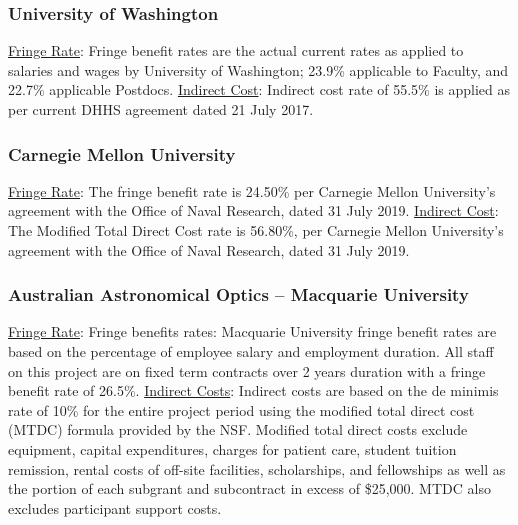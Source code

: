 \documentclass[oneside,11pt]{amsart}
\begin{document}
\subsubsection{University of Washington}

\underline{Fringe Rate}: Fringe benefit rates are the actual current
rates as applied to salaries and wages by University of Washington;
23.9\% applicable to Faculty, and 22.7\% applicable Postdocs.
\underline{Indirect Cost}: Indirect cost rate of 55.5\% is applied as
per current DHHS agreement dated 21 July 2017.

\subsubsection{Carnegie Mellon University}

\underline{Fringe Rate}: The fringe benefit rate is 24.50\% per
Carnegie Mellon University's agreement with the Office of Naval
Research, dated 31 July 2019. \underline{Indirect Cost}: The Modified
Total Direct Cost rate is 56.80\%, per Carnegie Mellon University's
agreement with the Office of Naval Research, dated 31 July 2019.

\subsubsection{Australian Astronomical Optics -- Macquarie University}

\underline{Fringe Rate}: Fringe benefits rates: Macquarie University
fringe benefit rates are based on the percentage of employee salary
and employment duration. All staff on this project are on fixed term
contracts over 2 years duration with a fringe benefit rate of 26.5\%.
\underline{Indirect Costs}: Indirect costs are based on the de
minimis rate of 10\% for the entire project period using the modified
total direct cost (MTDC) formula provided by the NSF. Modified total
direct costs exclude equipment, capital expenditures, charges for
patient care, student tuition remission, rental costs of off-site
facilities, scholarships, and fellowships as well as the portion of
each subgrant and subcontract in excess of \$25,000. MTDC also
excludes participant support costs.


\end{document}
